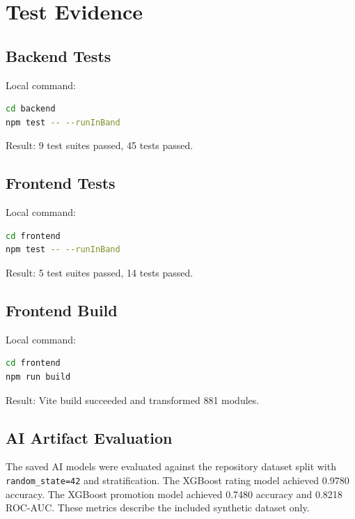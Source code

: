 \chapter{Test Evidence}
\section{Backend Tests}
Local command:
\begin{lstlisting}[language=bash]
cd backend
npm test -- --runInBand
\end{lstlisting}
Result: 9 test suites passed, 45 tests passed.

\section{Frontend Tests}
Local command:
\begin{lstlisting}[language=bash]
cd frontend
npm test -- --runInBand
\end{lstlisting}
Result: 5 test suites passed, 14 tests passed.

\section{Frontend Build}
Local command:
\begin{lstlisting}[language=bash]
cd frontend
npm run build
\end{lstlisting}
Result: Vite build succeeded and transformed 881 modules.

\section{AI Artifact Evaluation}
The saved AI models were evaluated against the repository dataset split with \texttt{random\_state=42} and stratification. The XGBoost rating model achieved 0.9780 accuracy. The XGBoost promotion model achieved 0.7480 accuracy and 0.8218 ROC-AUC. These metrics describe the included synthetic dataset only.
